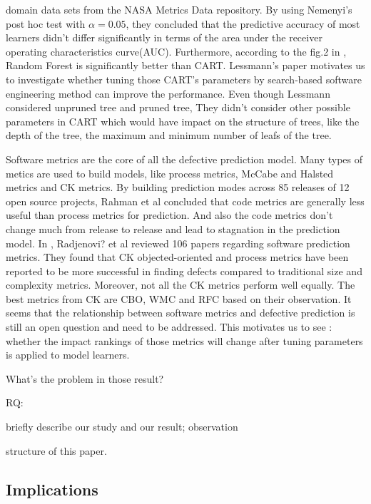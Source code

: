 \documentclass{sig-alternative}
\begin{document}
domain data sets from the NASA Metrics Data repository. By using Nemenyi's post hoc test 
with $\alpha = 0.05$, they concluded that the predictive accuracy of most learners didn't differ 
significantly in terms of the area under the receiver operating characteristics curve(AUC). 
Furthermore, according to the fig.2 in \cite{lessmann2008benchmarking}, Random Forest is 
significantly better than CART. Lessmann's paper motivates us to investigate whether tuning 
those CART's parameters by search-based software engineering method can improve the 
performance. Even though Lessmann considered unpruned tree and pruned tree, They didn't 
consider other possible parameters in CART which would have impact on the structure of 
trees, like the depth of the tree, the maximum and minimum number of leafs of the tree.

Software metrics are the core of all the defective prediction model. Many types of metics
are used to build models, like process metrics, McCabe and Halsted metrics  and CK metrics.
By building prediction modes across 85 releases of 12 open source projects, Rahman et al
\cite{rahman2013how}  concluded that code metrics are generally less useful than process
metrics for prediction. And also the code metrics don't change much from release to release
and lead to stagnation in the prediction model. In \cite{Radjenovi?20131397}, Radjenovi? et al
\cite{Radjenovi?20131397} reviewed 106 papers regarding software prediction metrics. They found
that CK objected-oriented and process metrics have been reported to be more successful in
finding defects compared to traditional size and complexity metrics. Moreover, not all the CK
metrics perform well equally. The best metrics from CK are CBO, WMC and RFC based on their 
observation. It seems that the relationship between software metrics and defective prediction is
still an open question and need to be addressed. This motivates us to see : whether the impact
rankings of those metrics will change after tuning parameters
is applied to model learners.



What's the problem in those result?

RQ:

briefly describe our study and  our result; observation

structure of this paper.

\subsection{Implications}
\end{document}
